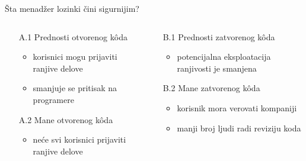 \documentclass[aspectratio=169,xcolor=dvipsnames]{beamer}
\begin{document}
\begin{frame}{Šta menadžer lozinki čini sigurnijim?}

    \begin{columns}

        \begin{column}{0.4\textwidth}
            \begin{enumerate}
                \item [A.1] Prednosti otvorenog k\^oda

                    \begin{itemize}
                        \item korisnici mogu prijaviti ranjive delove
                        \item smanjuje se pritisak na programere
                    \end{itemize}
                \item [A.2] Mane otvorenog k\^oda
                    \begin{itemize}
                        \item neće svi korisnici prijaviti ranjive delove
                    \end{itemize}
            \end{enumerate}
        \end{column}

        \begin{column}{0.4\textwidth}
            \begin{enumerate}
                \item [B.1] Prednosti zatvorenog k\^oda
                    \begin{itemize}
                        \item potencijalna eksploatacija ranjivosti je smanjena
                    \end{itemize}
                \item [B.2] Mane zatvorenog k\^oda
                    \begin{itemize}
                        \item korisnik mora verovati kompaniji
                        \item manji broj ljudi radi reviziju koda
                    \end{itemize}
            \end{enumerate}
        \end{column}

    \end{columns}

\end{frame}
\end{document}
